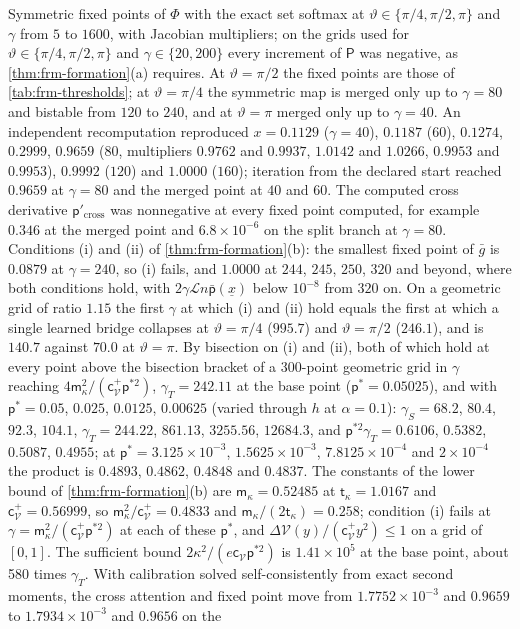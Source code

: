 \begin{numcheck}\label{chk:frm-thresholds}
Symmetric fixed points of $\Phi$ with the exact set softmax at $\vartheta\in\{\pi/4,\pi/2,\pi\}$ and $\gamma$ from $5$ to $1600$, with Jacobian multipliers; on the grids used for $\vartheta\in\{\pi/4,\pi/2,\pi\}$ and $\gamma\in\{20,200\}$ every increment of $\mathsf P$ was negative, as \cref{thm:frm-formation}(a) requires. At $\vartheta=\pi/2$ the fixed points are those of \cref{tab:frm-thresholds}; at $\vartheta=\pi/4$ the symmetric map is merged only up to $\gamma=80$ and bistable from $120$ to $240$, and at $\vartheta=\pi$ merged only up to $\gamma=40$. An independent recomputation reproduced $x=0.1129$ ($\gamma=40$), $0.1187$ ($60$), $0.1274$, $0.2999$, $0.9659$ ($80$, multipliers $0.9762$ and $0.9937$, $1.0142$ and $1.0266$, $0.9953$ and $0.9953$), $0.9992$ ($120$) and $1.0000$ ($160$); iteration from the declared start reached $0.9659$ at $\gamma=80$ and the merged point at $40$ and $60$. The computed cross derivative $\mathsf p'_{\mathrm{cross}}$ was nonnegative at every fixed point computed, for example $0.346$ at the merged point and $6.8\times10^{-6}$ on the split branch at $\gamma=80$. Conditions (i) and (ii) of \cref{thm:frm-formation}(b): the smallest fixed point of $\bar g$ is $0.0879$ at $\gamma=240$, so (i) fails, and $1.0000$ at $244$, $245$, $250$, $320$ and beyond, where both conditions hold, with $2\gamma\mathcal Ln\bar{\mathsf p}(\underline x)$ below $10^{-8}$ from $320$ on. On a geometric grid of ratio $1.15$ the first $\gamma$ at which (i) and (ii) hold equals the first at which a single learned bridge collapses at $\vartheta=\pi/4$ ($995.7$) and $\vartheta=\pi/2$ ($246.1$), and is $140.7$ against $70.0$ at $\vartheta=\pi$. By bisection on (i) and (ii), both of which hold at every point above the bisection bracket of a 300-point geometric grid in $\gamma$ reaching $4\mathsf m_\kappa^2/(\mathsf c^+_{\mathcal V}\mathsf p^{\ast2})$, $\gamma_T=242.11$ at the base point ($\mathsf p^\ast=0.05025$), and with $\mathsf p^\ast=0.05$, $0.025$, $0.0125$, $0.00625$ (varied through $h$ at $\alpha=0.1$): $\gamma_S=68.2$, $80.4$, $92.3$, $104.1$, $\gamma_T=244.22$, $861.13$, $3255.56$, $12684.3$, and $\mathsf p^{\ast2}\gamma_T=0.6106$, $0.5382$, $0.5087$, $0.4955$; at $\mathsf p^\ast=3.125\times10^{-3}$, $1.5625\times10^{-3}$, $7.8125\times10^{-4}$ and $2\times10^{-4}$ the product is $0.4893$, $0.4862$, $0.4848$ and $0.4837$. The constants of the lower bound of \cref{thm:frm-formation}(b) are $\mathsf m_\kappa=0.52485$ at $\mathsf t_\kappa=1.0167$ and $\mathsf c^+_{\mathcal V}=0.56999$, so $\mathsf m_\kappa^2/\mathsf c^+_{\mathcal V}=0.4833$ and $\mathsf m_\kappa/(2\mathsf t_\kappa)=0.258$; condition (i) fails at $\gamma=\mathsf m_\kappa^2/(\mathsf c^+_{\mathcal V}\mathsf p^{\ast2})$ at each of these $\mathsf p^\ast$, and $\Delta\mathcal V(y)/(\mathsf c^+_{\mathcal V}y^2)\le1$ on a grid of $[0,1]$. The sufficient bound $2\kappa^2/(e\mathsf c_{\mathcal V}\mathsf p^{\ast2})$ is $1.41\times10^5$ at the base point, about 580 times $\gamma_T$. With calibration solved self-consistently from exact second moments, the cross attention and fixed point move from $1.7752\times10^{-3}$ and $0.9659$ to $1.7934\times10^{-3}$ and $0.9656$ on the 
\end{numcheck}
